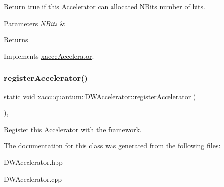 Return true if this \hyperlink{a01613}{Accelerator} can allocated N\+Bits number of bits. 
\begin{DoxyParams}{Parameters}
{\em N\+Bits} & \\
\hline
\end{DoxyParams}
\begin{DoxyReturn}{Returns}

\end{DoxyReturn}


Implements \hyperlink{a01613_ae51584850faeec77299058383977ddeb}{xacc\+::\+Accelerator}.

\mbox{\label{a01133_aece856713312dd2c882eee12392b04fa}} 
\subsubsection{\texorpdfstring{register\+Accelerator()}{registerAccelerator()}}
{\footnotesize\ttfamily static void xacc\+::quantum\+::\+D\+W\+Accelerator\+::register\+Accelerator (\begin{DoxyParamCaption}{ }\end{DoxyParamCaption})\hspace{0.3cm}{\ttfamily [inline]}, {\ttfamily [static]}}

Register this \hyperlink{a01613}{Accelerator} with the framework. 

The documentation for this class was generated from the following files\+:\begin{DoxyCompactItemize}
\item 
D\+W\+Accelerator.\+hpp\item 
D\+W\+Accelerator.\+cpp\end{DoxyCompactItemize}
